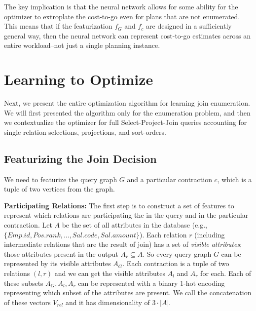 The key implication is that the neural network allows for some ability for the optimizer to extroplate the cost-to-go even for plans that are not enumerated. This means that if the featurization $f_G$ and $f_c$ are designed in a sufficiently general way, then the neural network can represent cost-to-go estimates across an entire workload--not just a single planning instance.


\section{Learning to Optimize}
Next, we present the entire optimization algorithm for learning join enumeration.
We will first presented the algorithm only for the enumeration problem, and then we contextualize the optimizer for full Select-Project-Join queries accounting for single relation selections, projections, and sort-orders.

\subsection*{Featurizing the Join Decision}
We need to featurize the query graph $G$ and a particular contraction $c$, which is a tuple of two vertices from the graph. 

\vspace{0.5em} \noindent \textbf{Participating Relations: } The first step is to construct a set of features to represent which relations are participating the in the query and in the particular contraction. Let $A$ be the set of all attributes in the database (e.g., $ \{Emp.id, Pos.rank,...,Sal.code,Sal.amount\}$). Each relation $r$ (including intermediate relations that are the result of join) has a set of \emph{visible attributes}; those attributes present in the output $A_r \subseteq A$. So every query graph $G$ can be represented by its visible attributes $A_G$. Each contraction is a tuple of two relations $(l,r)$ and we can get the visible attributes $A_l$ and $A_r$ for each. Each of these subsets $A_G, A_l, A_r$ can be represented with a binary 1-hot encoding representing which subset of the attributes are present. We call the concatenation of these vectors $V_{rel}$ and it has dimensionality of $3\cdot|A|$. 

